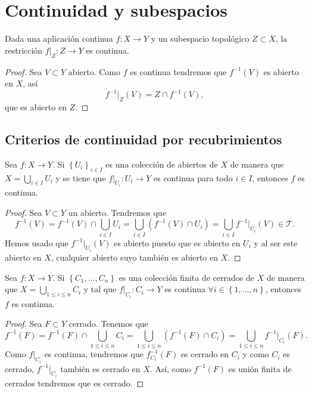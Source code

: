 \section{Continuidad y subespacios}
\begin{prop}
Dada una aplicación continua $\displaystyle f : X \to Y $ y un subespacio topológico $\displaystyle Z \subset X $, la restricción $\displaystyle f|_{Z} : Z \to Y $ es continua.
\end{prop}
\begin{proof}
Sea $\displaystyle V \subset Y $ abierto. Como $\displaystyle f $ es continua tendremos que $\displaystyle f^{-1}\left(V\right) $ es abierto en $\displaystyle X $, así
\[f^{-1}|_{Z} \left(V\right)= Z \cap f^{-1}\left(V\right) ,\]
que es abierto en $\displaystyle Z $. 
\end{proof}
\subsection*{Criterios de continuidad por recubrimientos}
\begin{prop}
	Sea $\displaystyle f : X \to Y $. Si $\displaystyle \left\{ U_{i} \right\} _{i \in I} $ es una colección de abiertos de $\displaystyle X $ de manera que $\displaystyle X = \bigcup_{i \in I}U_{i} $ y se tiene que $\displaystyle f |_{U_{i}}:U_{i} \to Y $ es continua para todo $\displaystyle i \in I $, entonces $\displaystyle f $ es continua. 
\end{prop}
\begin{proof}
Sea $\displaystyle V \subset Y $ un abierto. Tendremos que 
\[f^{-1}\left(V\right)=f^{-1}\left(V\right)\cap\bigcup_{i \in I}U_{i}=\bigcup_{i \in I}\left(f^{-1}\left(V\right)\cap U_{i}\right)=\bigcup_{i \in I}f^{-1}|_{U_{i}}\left(V\right)\in \mathcal{T} .\]
Hemos usado que $\displaystyle f^{-1}|_{U_{i}}\left(V\right) $ es abierto puesto que es abierto en $\displaystyle U_{i} $ y al ser este abierto en $\displaystyle X $, cualquier abierto suyo también es abierto en $\displaystyle X $.
\end{proof}
\begin{prop}
	Sea $\displaystyle f : X \to Y $. Si $\displaystyle \left\{ C_{1}, \ldots, C_{n}\right\}  $ es una colección finita de cerrados de $\displaystyle X $ de manera que $\displaystyle X = \bigcup_{1 \leq i \leq n}C_{i} $ y tal que $\displaystyle f|_{C_{i}}:C_{i} \to Y $ es continua $\displaystyle \forall i \in \left\{ 1, \ldots, n\right\}  $, entonces $\displaystyle f $ es continua. 
\end{prop}
\begin{proof}
Sea $\displaystyle F \subset Y $ cerrado. Tenemos que 
\[f^{-1}\left(F\right)=f^{-1}\left(F\right)\cap\bigcup_{1 \leq i \leq n}C_{i}=\bigcup_{1 \leq i \leq n}\left(f^{-1}\left(F\right)\cap C_{i}\right)=\bigcup_{1 \leq i \leq n}f^{-1}|_{C_{i}}\left(F\right) .\]
Como $\displaystyle f|_{C_{i}} $ es continua, tendremos que $\displaystyle f^{-1}_{C_{i}}\left(F\right) $ es cerrado en $\displaystyle C_{i} $ y como $\displaystyle C_{i} $ es cerrado, $\displaystyle f^{-1}|_{C_{i}} $ también es cerrado en $\displaystyle X $. Así, como $\displaystyle f^{-1}\left(F\right) $ es unión finita de cerrados tendremos que es cerrado. 
\end{proof}
